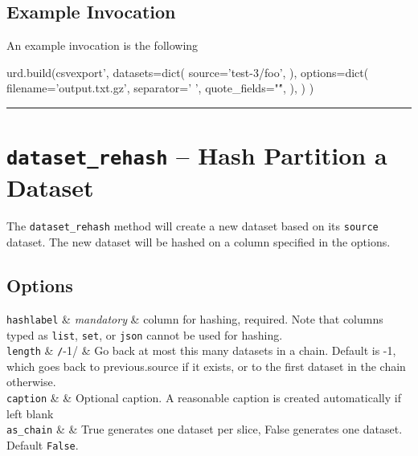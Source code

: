 \subsection{Example Invocation}
An example invocation is the following

\begin{python}
urd.build(csvexport',
    datasets=dict(
        source='test-3/foo',
    ),
    options=dict(
        filename='output.txt.gz',
        separator=' ',
        quote_fields="\'",
        ),
    )
)
\end{python}












\par\noindent\rule{\textwidth}{0.4pt}

\section{\texttt{dataset\_rehash} -- Hash Partition a Dataset}
\label{sec:dataset_rehash}

The \texttt{dataset\_rehash} method will create a new dataset based on
its \texttt{source} dataset.  The new dataset will be hashed on a
column specified in the options.

\subsection*{Options}
\starttable
  \RP \texttt{hashlabel} & \textsl{mandatory} & column for hashing,
  required.  Note that columns typed as \texttt{list}, \texttt{set},
  or \texttt{json} cannot be used for hashing.\\[1ex]

  \RP \texttt{length} & \texttt/-1/ & Go back at most this
  many datasets in a chain.  Default is -1, which goes back to
  previous.source if it exists, or to the first dataset in the chain
  otherwise.\\[1ex]

  \RP \texttt{caption} & & Optional caption.  A
  reasonable caption is created automatically if left blank\\[1ex]

  \texttt{as\_chain} & \pyFalse & True generates one dataset per slice, False
  generates one dataset.  Default \texttt{False}.\\
\stoptable


